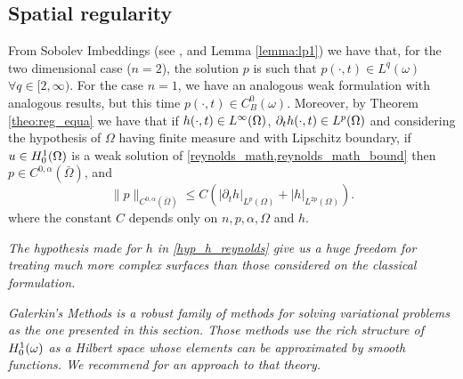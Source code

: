 \subsection{Spatial regularity}
From Sobolev Imbeddings (see  , and Lemma \ref{lemma:lp1}) we have that, for the two dimensional case ($n=2$), the solution $p$ is such that $p(\cdot,t)\in L^q(\omega)$ $\forall q\in [2,\infty)$. For the case $n=1$, we have an analogous weak formulation with analogous results, but this time $p(\cdot,t)\in C_B^0(\omega)$. Moreover, by Theorem \ref{theo:reg_equa} we have that if $h(\cdot,t)\in {L^{\infty}(\Omega)}$, $\partial_t h(\cdot,t)\in 
{L^{p}(\Omega)}$ and considering the hypothesis of $\Omega$ having finite measure and with Lipschitz boundary, if $u\in {H_0^1(\Omega)}$ is a weak solution of \eqref{reynolds_math,reynolds_math_bound} then $p\in C^{0,\alpha}(\bar\Omega)$, and 
$$
\|p\|_{ C^{0,\alpha}(\bar\Omega)}\leq C\left(|\partial_t h|_{L^{p}(\Omega)}+|h|_{L^{2p}(\Omega)}\right).
$$
where the constant $C$ depends only on $n,p,\alpha,\Omega$ and $h$.
\begin{remark}
\it The hypothesis made for $h$ in \eqref*{hyp_h_reynolds} give us a huge freedom for treating much more complex surfaces than those considered on the classical formulation.
\end{remark}
\begin{remark}
\it Galerkin's Methods is a robust family of methods for solving  variational problems as the one presented in this section. Those methods use the rich structure of ${H_0^1(\omega)}$ as a Hilbert space whose elements can be approximated by smooth functions. We recommend \cite{brenner2002} for an approach to that theory.
\end{remark}

